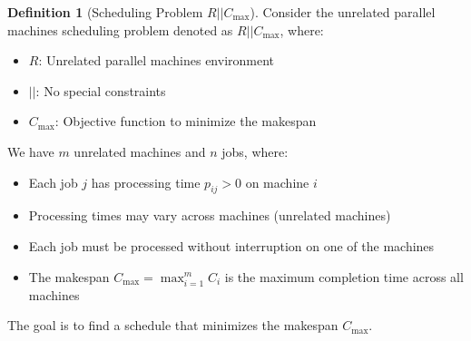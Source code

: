 \documentclass{article}
\theoremstyle{definition}
\newtheorem{definition}{Definition}
\begin{document}
\begin{definition}[Scheduling Problem $R||C_{\max}$]
Consider the unrelated parallel machines scheduling problem denoted as $R||C_{\max}$, where:
\begin{itemize}
    \item $R$: Unrelated parallel machines environment
    \item $||$: No special constraints
    \item $C_{\max}$: Objective function to minimize the makespan
\end{itemize}

We have $m$ unrelated machines and $n$ jobs, where:
\begin{itemize}
    \item Each job $j$ has processing time $p_{ij} > 0$ on machine $i$
    \item Processing times may vary across machines (unrelated machines)
    \item Each job must be processed without interruption on one of the machines
    \item The makespan $C_{\max} = \max_{i=1}^{m} C_i$ is the maximum completion time across all machines
\end{itemize}

The goal is to find a schedule that minimizes the makespan $C_{\max}$.
\end{definition}
\end{document}
